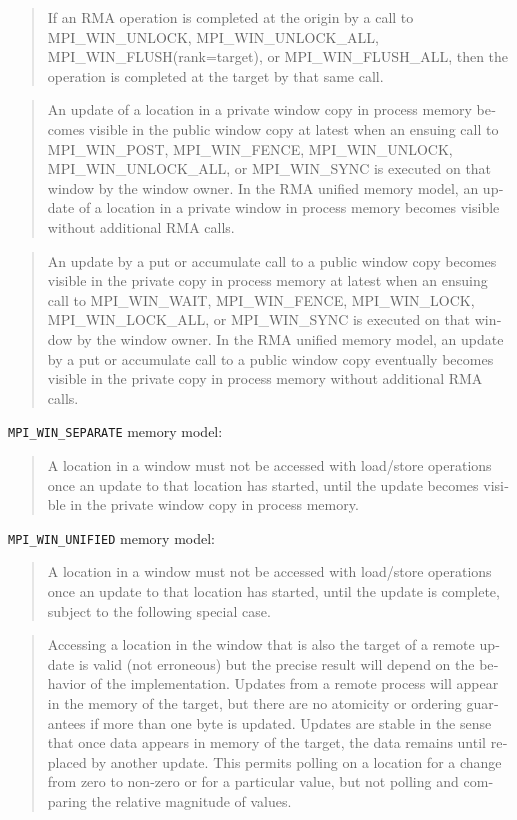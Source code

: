 \foreignblockcquote{english}[Kapitel 11.7, S. 453]{MPI-3.1}{%
    If an RMA operation is completed at the origin by a call to MPI\_WIN\_UNLOCK,
    MPI\_WIN\_UNLOCK\_ALL, MPI\_WIN\_FLUSH(rank=target), or
    MPI\_WIN\_FLUSH\_ALL, then the operation is completed at the target by that same
    call.}

\foreignblockcquote{english}[Kapitel 11.7, S. 453]{MPI-3.1}{%
    An update of a location in a private window copy in process memory becomes visible
    in the public window copy at latest when an ensuing call to MPI\_WIN\_POST,
    MPI\_WIN\_FENCE, MPI\_WIN\_UNLOCK, MPI\_WIN\_UNLOCK\_ALL, or
    MPI\_WIN\_SYNC is executed on that window by the window owner. In the RMA
    unified memory model, an update of a location in a private window in process memory
    becomes visible without additional RMA calls.}

\foreignblockcquote{english}[Kapitel 11.7, S. 453]{MPI-3.1}{%
    An update by a put or accumulate call to a public window copy becomes visible in the
    private copy in process memory at latest when an ensuing call to MPI\_WIN\_WAIT,
    MPI\_WIN\_FENCE, MPI\_WIN\_LOCK, MPI\_WIN\_LOCK\_ALL, or MPI\_WIN\_SYNC is
    executed on that window by the window owner. In the RMA unified memory model,
    an update by a put or accumulate call to a public window copy eventually becomes
    visible in the private copy in process memory without additional RMA calls.}

\texttt{MPI\_WIN\_SEPARATE} memory model:

\foreignblockcquote{english}[Kapitel 11.7, S. 454]{MPI-3.1}{%
    A location in a window must not be accessed with load/store operations once an
    update to that location has started, until the update becomes visible in the private
    window copy in process memory.}

\texttt{MPI\_WIN\_UNIFIED} memory model:

\foreignblockcquote{english}[Kapitel 11.7, S. 455]{MPI-3.1}{%
    A location in a window must not be accessed with load/store operations once an
    update to that location has started, until the update is complete, subject to the
    following special case.}

\foreignblockcquote{english}[Kapitel 11.7, S. 455]{MPI-3.1}{%
    Accessing a location in the window that is also the target of a remote update is valid
    (not erroneous) but the precise result will depend on the behavior of the implementation.
    Updates from a remote process will appear in the memory of the target, but
    there are no atomicity or ordering guarantees if more than one byte is updated.
    Updates are stable in the sense that once data appears in memory of the target, the data
    remains until replaced by another update. This permits polling on a location for a
    change from zero to non-zero or for a particular value, but not polling and comparing
    the relative magnitude of values.}

